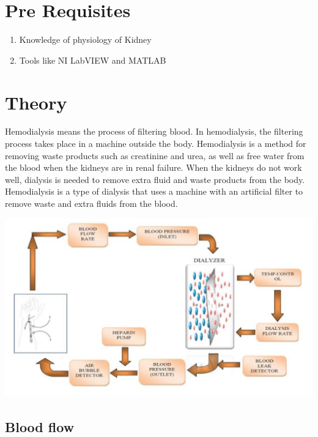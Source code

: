 \documentclass[
  11pt,
  letterpaper,
  DIV=11,
  numbers=noendperiod]{scrreprt}
\providecommand{\tightlist}{%
  \setlength{\itemsep}{0pt}\setlength{\parskip}{0pt}}\usepackage{longtable,booktabs,array}
\begin{document}
\section{Pre Requisites}\label{pre-requisites-4}

\begin{enumerate}
\def\labelenumi{\arabic{enumi}.}
\tightlist
\item
  Knowledge of physiology of Kidney
\item
  Tools like NI LabVIEW and MATLAB
\end{enumerate}

\section{Theory}\label{theory-9}

Hemodialysis means the process of filtering blood. In hemodialysis, the
filtering process takes place in a machine outside the body.
Hemodialysis is a method for removing waste products such as creatinine
and urea, as well as free water from the blood when the kidneys are in
renal failure. When the kidneys do not work well, dialysis is needed to
remove extra fluid and waste products from the body. Hemodialysis is a
type of dialysis that uses a machine with an artificial filter to remove
waste and extra fluids from the blood.

\includegraphics[width=6.33333in,height=\textheight]{images/clipboard-2703843569.png}

\subsection{Blood flow}\label{blood-flow}
\end{document}

